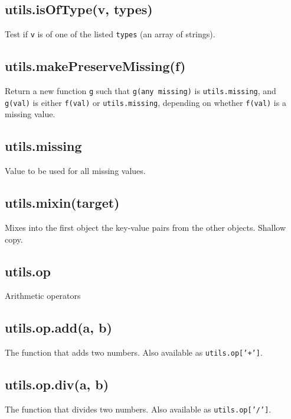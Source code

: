 \documentclass{article}
\begin{document}
    \subsection*{utils.isOfType(v, types)}
    Test if \texttt{v} is of one of the listed \texttt{types} (an array of strings).


    \subsection*{utils.makePreserveMissing(f)}
    Return a new function \texttt{g} such that \texttt{g(any missing)} is \texttt{utils.missing},
and \texttt{g(val)} is either \texttt{f(val)} or \texttt{utils.missing}, depending on whether
\texttt{f(val)} is a missing value.


    \subsection*{utils.missing}
    Value to be used for all missing values.


    \subsection*{utils.mixin(target)}
    Mixes into the first object the key-value pairs from the other objects.
Shallow copy.


    \subsection*{utils.op}
    Arithmetic operators


    \subsection*{utils.op.add(a, b)}
    The function that adds two numbers. Also available as \texttt{utils.op['+']}.


    \subsection*{utils.op.div(a, b)}
    The function that divides two numbers. Also available as \texttt{utils.op['/']}.
\end{document}
